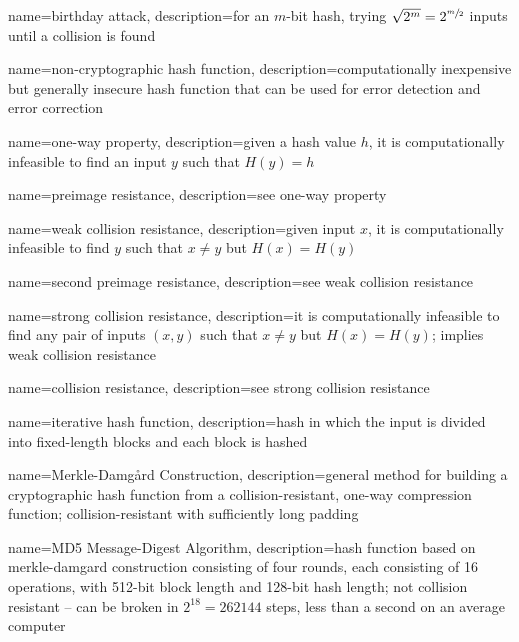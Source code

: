 {
    name={birthday attack},
    description={for an $m$-bit hash, trying $\sqrt{2^m} = 2^{\sfrac{m}{2}}$ inputs until a collision is found}
}

{
    name={non-cryptographic hash function},
    description={computationally inexpensive but generally insecure hash function that can be used for error detection and error correction}
}

{
    name={one-way property},
    description={given a hash value $h$, it is computationally infeasible to find an input $y$ such that $H(y) = h$}
}

{
    name={preimage resistance},
    description={see \gls{one-way property}}
}

{
    name={weak collision resistance},
    description={given input $x$, it is computationally infeasible to find $y$ such that $x\neq y$ but $H(x) = H(y)$}
}

{
    name={second preimage resistance},
    description={see \gls{weak collision resistance}}
}

{
    name={strong collision resistance},
    description={it is computationally infeasible to find any pair of inputs $(x, y)$ such that $x\neq y$ but $H(x) = H(y)$; implies \gls{weak collision resistance}}
}

{
    name={collision resistance},
    description={see \gls{strong collision resistance}}
}

{
    name={iterative hash function},
    description={hash in which the input is divided into fixed-length blocks and each block is hashed}
}

{
    name={Merkle-Damg\r{a}rd Construction},
    description={general method for building a cryptographic hash function from a collision-resistant, one-way compression function; collision-resistant with sufficiently long padding}
}

{
    name={MD5 Message-Digest Algorithm},
    description={hash function based on \gls{merkle-damgard construction} consisting of four rounds, each consisting of 16 operations, with 512-bit block length and 128-bit hash length; not collision resistant -- can be broken in $2^{18} = 262144$ steps, less than a second on an average computer}
}

